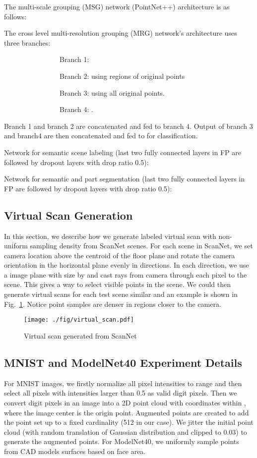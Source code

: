 \documentclass{article}
\begin{document}
The multi-scale grouping (MSG) network (PointNet++) architecture is as follows:


The cross level multi-resolution grouping (MRG) network's architecture uses three branches:

~~~~~~~~~~~~~~~~Branch 1: 

~~~~~~~~~~~~~~~~Branch 2:  using  regions of original points

~~~~~~~~~~~~~~~~Branch 3:  using all original points.

~~~~~~~~~~~~~~~~Branch 4: . 

Branch 1 and branch 2 are concatenated and fed to branch 4. Output of branch 3 and branch4 are then concatenated and fed to  for classification. 


Network for semantic scene labeling (last two fully connected layers in FP are followed by dropout layers with drop ratio 0.5):



Network for semantic and part segmentation (last two fully connected layers in FP are followed by dropout layers with drop ratio 0.5):


\subsection{Virtual Scan Generation}
In this section, we describe how we generate labeled virtual scan with non-uniform sampling density from ScanNet scenes. For each scene in ScanNet, we set camera location  above the centroid of the floor plane and rotate the camera orientation in the horizontal plane evenly in  directions. In each direction, we use a image plane with size  by  and cast rays from camera through each pixel to the scene. This gives a way to select visible points in the scene. We could then generate  virtual scans for each test scene similar and an example is shown in Fig.~\ref{fig:virtual_scan}. Notice point samples are denser in regions closer to the camera.

\begin{figure}[h!]
  \begin{center}
    \texttt{[image: ./fig/virtual\_scan.pdf]}
  \end{center}
  \caption{Virtual scan generated from ScanNet}
  \label{fig:virtual_scan}
\end{figure}

\subsection{MNIST and ModelNet40 Experiment Details}
For MNIST images, we firstly normalize all pixel intensities to range  and then select all pixels with intensities larger than 0.5 as valid digit pixels. Then we convert digit pixels in an image into a 2D point cloud with coordinates within , where the image center is the origin point. Augmented points are created to add the point set up to a fixed cardinality (512 in our case). We jitter the initial point cloud (with random translation of Gaussian distribution  and clipped to 0.03) to generate the augmented points. For ModelNet40, we uniformly sample  points from CAD models surfaces based on face area.
\end{document}
